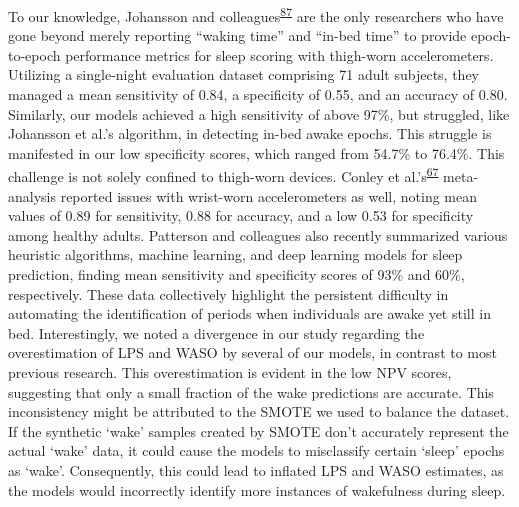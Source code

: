 \documentclass[
  10pt,
]{scrbook}
\begin{document}
To our knowledge, Johansson and
colleagues\textsuperscript{\protect\hyperlink{ref-johansson_development_2023}{87}}
are the only researchers who have gone beyond merely reporting ``waking
time'' and ``in-bed time'' to provide epoch-to-epoch performance metrics
for sleep scoring with thigh-worn accelerometers. Utilizing a
single-night evaluation dataset comprising 71 adult subjects, they
managed a mean sensitivity of 0.84, a specificity of 0.55, and an
accuracy of 0.80. Similarly, our models achieved a high sensitivity of
above 97\%, but struggled, like Johansson et al.'s algorithm, in
detecting in-bed awake epochs. This struggle is manifested in our low
specificity scores, which ranged from 54.7\% to 76.4\%. This challenge
is not solely confined to thigh-worn devices. Conley et
al.'s\textsuperscript{\protect\hyperlink{ref-conley_agreement_2019}{67}}
meta-analysis reported issues with wrist-worn accelerometers as well,
noting mean values of 0.89 for sensitivity, 0.88 for accuracy, and a low
0.53 for specificity among healthy adults. Patterson and colleagues also
recently summarized various heuristic algorithms, machine learning, and
deep learning models for sleep prediction, finding mean sensitivity and
specificity scores of 93\% and 60\%, respectively. These data
collectively highlight the persistent difficulty in automating the
identification of periods when individuals are awake yet still in bed.
Interestingly, we noted a divergence in our study regarding the
overestimation of LPS and WASO by several of our models, in contrast to
most previous research. This overestimation is evident in the low NPV
scores, suggesting that only a small fraction of the wake predictions
are accurate. This inconsistency might be attributed to the SMOTE we
used to balance the dataset. If the synthetic `wake' samples created by
SMOTE don't accurately represent the actual `wake' data, it could cause
the models to misclassify certain `sleep' epochs as `wake'.
Consequently, this could lead to inflated LPS and WASO estimates, as the
models would incorrectly identify more instances of wakefulness during
sleep.
\end{document}
